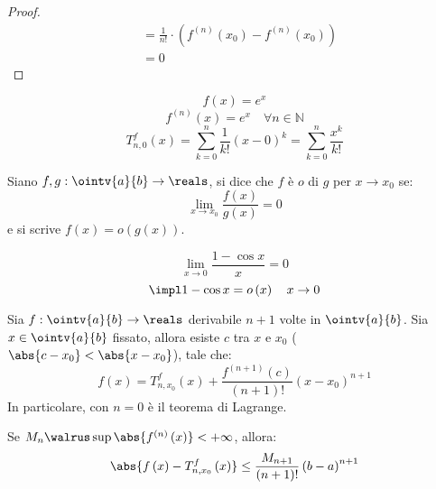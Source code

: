 \begin{proof}
\begin{align*}
                                                                              & =\frac{1}{n!}\cdot\left(f^{\left(n\right)}\left(x_0\right)-f^{\left(n\right)}\left(x_0\right)\right)                                                                                                                                                \\
                                                                              & =0                                                                                                                                                                                                                                                  
  \end{align*}
\end{proof}

\begin{example}
  $$f\left(x\right)=e^x$$
  $$f^{\left(n\right)}\left(x\right)=e^x\quad \forall n\in\mathbb{N}$$
  $$T_{n,0}^f\left(x\right)=\sum_{k=0}^n\frac{1}{k!}\left(x-0\right)^k=\sum_{k=0}^n\frac{x^k}{k!}$$
\end{example}

\begin{definition}[$o$]
  Siano $f,g:\ointv{a}{b}\to\reals$, si dice che $f$ è $o$ di $g$ per $x\to x_0$ se:
  $$\lim_{x\to x_0}\frac{f\left(x\right)}{g\left(x\right)}=0$$
  e si scrive $f\left(x\right)=o\left(g\left(x\right)\right)$.
\end{definition}

\begin{example}
  $$\lim_{x\to 0}\frac{1-\cos x}{x}=0$$
  $$\impl 1-\cos x=o\left(x\right)\quad x\to0$$
\end{example}

\begin{theorem}
  Sia $f:\ointv{a}{b}\to\reals$ derivabile $n+1$ volte in $\ointv{a}{b}$. Sia $x\in\ointv{a}{b}$ fissato, allora esiste $c$ tra $x$ e $x_0$ ($\abs{c-x_0}<\abs{x-x_0}$), tale che:
  $$f\left(x\right)=T_{n,x_0}^f\left(x\right)+\frac{f^{\left(n+1\right)}\left(c\right)}{\left(n+1\right)!}\left(x-x_0\right)^{n+1}$$
  In particolare, con $n=0$ è il teorema di Lagrange.
\end{theorem}

\begin{corollary}
  Se $M_n\walrus \sup \abs{f^{\left(n\right)}\left(x\right)}<+\infty$, allora:
  $$\abs{f\left(x\right)-T_{n,x_0}^f\left(x\right)}\le \frac{M_{n+1}}{\left(n+1\right)!}\left(b-a\right)^{n+1}$$
\end{corollary}

